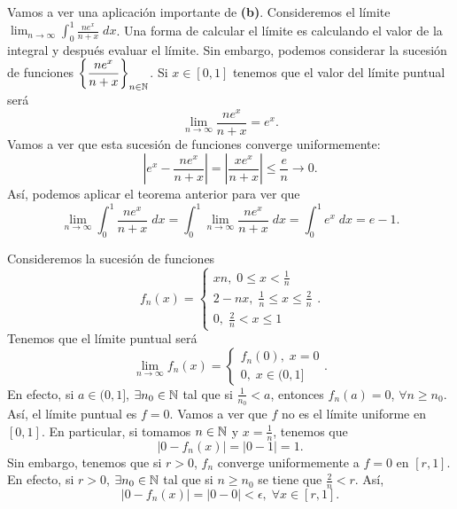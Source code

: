 \begin{eg}
	\normalfont Vamos a ver una aplicación importante de \textbf{(b)}. Consideremos el límite $\displaystyle \lim_{n \to \infty}\int^{1}_{0} \frac{ne^{x}}{n + x} \; dx $. Una forma de calcular el límite es calculando el valor de la integral y después evaluar el límite. Sin embargo, podemos considerar la sucesión de funciones $\displaystyle \left\{ \frac{ne^{x}}{n + x}\right\} _{n\in \mathbb{N}} $.  Si $\displaystyle x \in \left[0,1\right]  $ tenemos que el valor del límite puntual será
	\[\lim_{n \to \infty}\frac{ne^{x}}{n+x} = e^{x} .\]
Vamos a ver que esta sucesión de funciones converge uniformemente: 
\[ \left|e^{x} - \frac{ne^{x}}{n + x}\right| = \left|\frac{xe^{x}}{n + x}\right| \leq \frac{e}{n} \to 0 .\]
Así, podemos aplicar el teorema anterior para ver que
\[\lim_{n \to \infty}\int^{1}_{0} \frac{ne^{x}}{n + x} \; dx = \int^{1}_{0} \lim_{n \to \infty}\frac{ne^{x}}{n + x} \; dx = \int^{1}_{0} e^{x} \; dx = e-1 .\]
\end{eg}
\begin{eg}
\normalfont Consideremos la sucesión de funciones
\[f_{n}\left(x\right) =
\begin{cases}
xn, \; 0 \leq x < \frac{1}{n} \\
2 - nx, \; \frac{1}{n} \leq x \leq \frac{2}{n} \\
0, \; \frac{2}{n} < x \leq 1
\end{cases}
.\]
Tenemos que el límite puntual será
\[\lim_{n \to \infty}f_{n}\left(x\right) = 
\begin{cases}
f_{n}\left(0\right), \; x = 0 \\
0, \; x \in (0,1]
\end{cases}
.\]
En efecto, si $\displaystyle a \in (0,1] $, $\displaystyle \exists n_{0} \in \mathbb{N} $ tal que si $\displaystyle \frac{1}{n_{0}} < a $, entonces $\displaystyle f_{n}\left(a\right) = 0 $, $\displaystyle \forall n \geq n_{0} $. Así, el límite puntual es $\displaystyle f = 0 $. Vamos a ver que $\displaystyle f $ no es el límite uniforme en $\displaystyle \left[0,1\right]  $. En particular, si tomamos $\displaystyle n \in \mathbb{N} $ y $\displaystyle x = \frac{1}{n} $, tenemos que 
\[ \left|0-f_{n}\left(x\right)\right| =  \left|0 - 1\right| = 1.\]
Sin embargo, tenemos que si $\displaystyle r > 0 $, $\displaystyle f_{n} $ converge uniformemente a $\displaystyle f = 0 $ en $\displaystyle \left[r,1\right]  $. En efecto, si $\displaystyle r > 0 $, $\displaystyle \exists n_{0} \in \mathbb{N} $ tal que si $\displaystyle n \geq n_{0} $ se tiene que $\displaystyle \frac{2}{n} < r $. Así,
\[ \left|0 - f_{n}\left(x\right)\right| = \left|0 - 0\right| < \epsilon , \; \forall x \in \left[r,1\right]  .\]
\end{eg}
